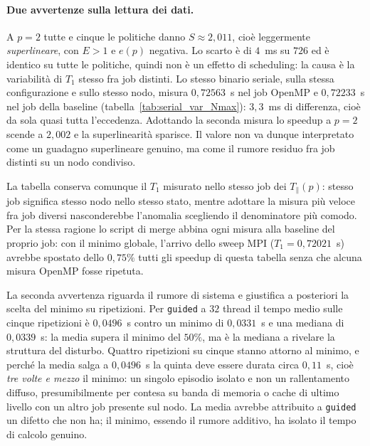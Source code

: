 \paragraph{Due avvertenze sulla lettura dei dati.}
A $p=2$ tutte e cinque le politiche danno $S \approx 2{,}011$, cioè leggermente
\emph{superlineare}, con $E > 1$ e $e(p)$ negativa. Lo scarto è di $4$~ms su
$726$ ed è identico su tutte le politiche, quindi non è un effetto di
scheduling: la causa è la variabilità di $T_1$ stesso fra job distinti. Lo
stesso binario seriale, sulla stessa configurazione e sullo stesso nodo, misura
$0{,}72563$~s nel job OpenMP e $0{,}72233$~s nel job della baseline
(tabella~\ref{tab:serial_var_Nmax}): $3{,}3$~ms di differenza, cioè da sola
quasi tutta l'eccedenza. Adottando la seconda misura lo speedup a $p = 2$ scende
a $2{,}002$ e la superlinearità sparisce. Il valore non va dunque interpretato
come un guadagno superlineare genuino, ma come il rumore residuo fra job
distinti su un nodo condiviso.

La tabella conserva comunque il $T_1$ misurato nello stesso job dei
$T_\parallel(p)$: stesso job significa stesso nodo nello stesso stato, mentre
adottare la misura più veloce fra job diversi nasconderebbe l'anomalia
scegliendo il denominatore più comodo. Per la stessa ragione lo script di merge
abbina ogni misura alla baseline del proprio job: con il minimo globale, l'arrivo
dello sweep MPI ($T_1 = 0{,}72021$~s) avrebbe spostato dello $0{,}75\%$ tutti gli
speedup di questa tabella senza che alcuna misura OpenMP fosse ripetuta.

La seconda avvertenza riguarda il rumore di sistema e giustifica a posteriori la
scelta del minimo su ripetizioni. Per \texttt{guided} a $32$ thread il tempo
medio sulle cinque ripetizioni è $0{,}0496$~s contro un minimo di $0{,}0331$~s e
una mediana di $0{,}0339$~s: la media supera il minimo del $50\%$, ma è la
mediana a rivelare la struttura del disturbo. Quattro ripetizioni su cinque
stanno attorno al minimo, e perché la media salga a $0{,}0496$~s la quinta deve
essere durata circa $0{,}11$~s, cioè \emph{tre volte e mezzo} il minimo: un
singolo episodio isolato e non un rallentamento diffuso, presumibilmente per
contesa su banda di memoria o cache di ultimo livello con un altro job presente
sul nodo. La media avrebbe attribuito a \texttt{guided} un difetto che non ha;
il minimo, essendo il rumore additivo, ha isolato il tempo di calcolo genuino.

